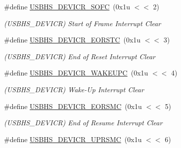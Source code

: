 \begin{DoxyCompactItemize}
\mbox{\label{group__SAMS70__USBHS_gaffa039519be07398014a73c69f85f5ba}} 
\#define \mbox{\hyperlink{group__SAMS70__USBHS_gaffa039519be07398014a73c69f85f5ba}{U\+S\+B\+H\+S\+\_\+\+D\+E\+V\+I\+C\+R\+\_\+\+S\+O\+FC}}~(0x1u $<$$<$ 2)
\begin{DoxyCompactList}\small\item\em (U\+S\+B\+H\+S\+\_\+\+D\+E\+V\+I\+CR) Start of Frame Interrupt Clear \end{DoxyCompactList}\item 
\mbox{\label{group__SAMS70__USBHS_ga74ab01c2fc258f8624d8ef2258a234a6}} 
\#define \mbox{\hyperlink{group__SAMS70__USBHS_ga74ab01c2fc258f8624d8ef2258a234a6}{U\+S\+B\+H\+S\+\_\+\+D\+E\+V\+I\+C\+R\+\_\+\+E\+O\+R\+S\+TC}}~(0x1u $<$$<$ 3)
\begin{DoxyCompactList}\small\item\em (U\+S\+B\+H\+S\+\_\+\+D\+E\+V\+I\+CR) End of Reset Interrupt Clear \end{DoxyCompactList}\item 
\mbox{\label{group__SAMS70__USBHS_ga8fecdd7991b62569cb29696878645573}} 
\#define \mbox{\hyperlink{group__SAMS70__USBHS_ga8fecdd7991b62569cb29696878645573}{U\+S\+B\+H\+S\+\_\+\+D\+E\+V\+I\+C\+R\+\_\+\+W\+A\+K\+E\+U\+PC}}~(0x1u $<$$<$ 4)
\begin{DoxyCompactList}\small\item\em (U\+S\+B\+H\+S\+\_\+\+D\+E\+V\+I\+CR) Wake-\/\+Up Interrupt Clear \end{DoxyCompactList}\item 
\mbox{\label{group__SAMS70__USBHS_ga7715c7114ce70e74380d322a88fafb8a}} 
\#define \mbox{\hyperlink{group__SAMS70__USBHS_ga7715c7114ce70e74380d322a88fafb8a}{U\+S\+B\+H\+S\+\_\+\+D\+E\+V\+I\+C\+R\+\_\+\+E\+O\+R\+S\+MC}}~(0x1u $<$$<$ 5)
\begin{DoxyCompactList}\small\item\em (U\+S\+B\+H\+S\+\_\+\+D\+E\+V\+I\+CR) End of Resume Interrupt Clear \end{DoxyCompactList}\item 
\mbox{\label{group__SAMS70__USBHS_gaac23a533c39c6388e41f0a25dcd7a8c0}} 
\#define \mbox{\hyperlink{group__SAMS70__USBHS_gaac23a533c39c6388e41f0a25dcd7a8c0}{U\+S\+B\+H\+S\+\_\+\+D\+E\+V\+I\+C\+R\+\_\+\+U\+P\+R\+S\+MC}}~(0x1u $<$$<$ 6)
$$
\end{DoxyCompactItemize}
